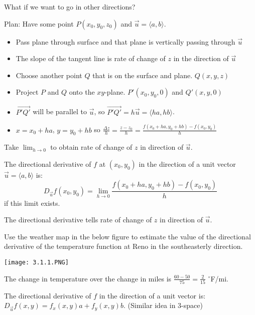 \documentclass[../calc3.tex]{subfiles}
\begin{document}
What if we want to go in other directions?

Plan: Have some point $P(x_0,y_0,z_0)$ and $\vec{u}=\langle a,b\rangle$.

\begin{itemize}
    \item Pass plane through surface and that plane is vertically passing through $\vec{u}$
    \item The slope of the tangent line is rate of change of $z$ in the direction of $\vec{u}$
    \item Choose another point $Q$ that is on the surface and plane. $Q(x,y,z)$
    \item Project $P$ and $Q$ onto the $xy$-plane. $P'(x_0,y_0,0)$ and $Q'(x,y,0)$
    \item $\vec{P'Q'}$ will be parallel to $\vec{u}$, so $\vec{P'Q'}=h\vec{u}=\langle ha, hb\rangle$.
    \item $x=x_0+ha$, $y=y_0+hb$ so $\frac{\Delta z}{h}=\frac{z-z_0}{h}=\frac{f(x_0+ha,y_0+hb)-f(x_0,y_0)}{h}$
\end{itemize}
Take $\lim_{h\to 0}$ to obtain rate of change of $z$ in direction of $\vec{u}$.

\pagebreak
\begin{definition}
    The directional derivative of $f$ at $(x_0,y_0)$ in the direction of a unit vector $\vec{u}=\langle a,b\rangle$ is:
    \[ D_{\vec{u}}f(x_0,y_0)=\lim_{h\to 0}\frac{f(x_0+ha,y_0+hb)-f(x_0,y_0)}{h} \]
    if this limit exists.
\end{definition}

The directional derivative tells rate of change of $z$ in direction of $\vec{u}$.

\begin{example}
    Use the weather map in the below figure to estimate the value of the directional derivative of the temperature function at Reno in the southeasterly direction.
    \begin{center}
        \texttt{[image: 3.1.1.PNG]}
    \end{center}

    The change in temperature over the change in miles is $\frac{60-50}{75}=\frac{2}{15}$ $^{\circ}$F/mi.
\end{example}

\begin{theorem}
    The directional derivative of $f$ in the direction of a unit vector is: $D_{\vec{u}}f(x,y)=f_x(x,y)a+f_y(x,y)b$. (Similar idea in 3-space)
\end{theorem}
\end{document}

